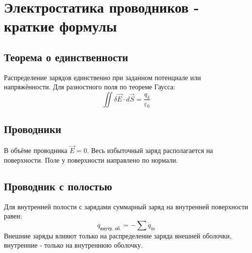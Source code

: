 \documentclass[12pt]{article}
\begin{document}
\section*{Электростатика проводников - краткие формулы}

\subsection*{Теорема о единственности}
Распределение зарядов единственно при заданном потенциале или напряжённости. Для разностного поля по теореме Гаусса:
\[\iint \delta\vec E\cdot d\vec S=\frac{q_\delta}{\varepsilon_0}\]

\subsection*{Проводники}
В объёме проводника $\vec E = 0$. Весь избыточный заряд располагается на поверхности. Поле у поверхности направлено по нормали.

\subsection*{Проводник с полостью}
Для внутренней полости с зарядами суммарный заряд на внутренней поверхности равен:
\[q_{\text{внутр. об.}} = - \sum q_{\text{in}}\]
Внешние заряды влияют только на распределение заряда внешней оболочки, внутренние - только на внутреннюю оболочку.
\end{document}
